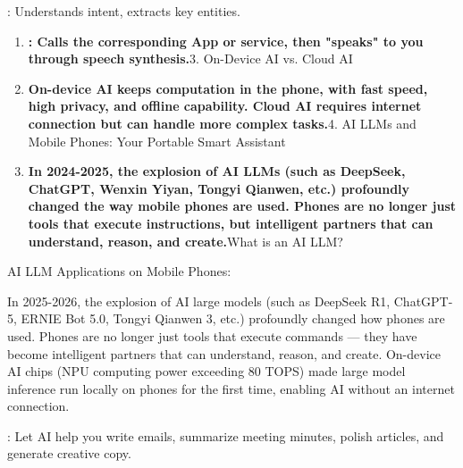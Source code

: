 


: Understands intent, extracts key entities.


\begin{enumerate}
  \item \textbf{: Calls the corresponding App or service, then "speaks" to you through speech synthesis.}3. On-Device AI vs. Cloud AI
  \item \textbf{On-device AI keeps computation in the phone, with fast speed, high privacy, and offline capability. Cloud AI requires internet connection but can handle more complex tasks.}4. AI LLMs and Mobile Phones: Your Portable Smart Assistant
  \item \textbf{In 2024-2025, the explosion of AI LLMs (such as DeepSeek, ChatGPT, Wenxin Yiyan, Tongyi Qianwen, etc.) profoundly changed the way mobile phones are used. Phones are no longer just tools that execute instructions, but intelligent partners that can understand, reason, and create.}What is an AI LLM?
\end{enumerate}


AI LLM Applications on Mobile Phones:


In 2025-2026, the explosion of AI large models (such as DeepSeek R1, ChatGPT-5, ERNIE Bot 5.0, Tongyi Qianwen 3, etc.) profoundly changed how phones are used. Phones are no longer just tools that execute commands — they have become intelligent partners that can understand, reason, and create. On-device AI chips (NPU computing power exceeding 80 TOPS) made large model inference run locally on phones for the first time, enabling AI without an internet connection.


: Let AI help you write emails, summarize meeting minutes, polish articles, and generate creative copy.

